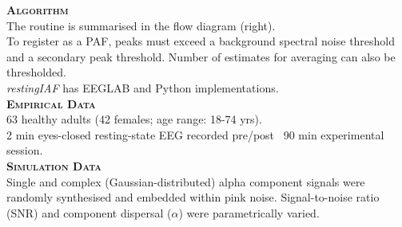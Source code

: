 \documentclass[landscape,a0paper,fontscale=.235]{xebaposter} %
\begin{document}
\begin{poster}
{\textbf{\textsc{Algorithm}}
\\The routine is summarised in the flow diagram (right).
\\To register as a PAF, peaks must exceed a background spectral noise threshold and a secondary peak threshold. Number of estimates for averaging can also be thresholded.
\\ \emph{restingIAF} has EEGLAB and Python implementations.
\\[.25cm]
\textbf{\textsc{Empirical Data}}
\\63 healthy adults (42 females; age range: 18-74 yrs).
\\2 min eyes-closed resting-state EEG recorded pre/post ~90 min experimental session.
\\[.25cm]
\textbf{\textsc{Simulation Data}}
\\Single and complex (Gaussian-distributed) alpha component signals were randomly synthesised and embedded within pink noise. Signal-to-noise ratio (SNR) and component dispersal ($\alpha$) were parametrically varied.


}



\end{poster}
\end{document}

